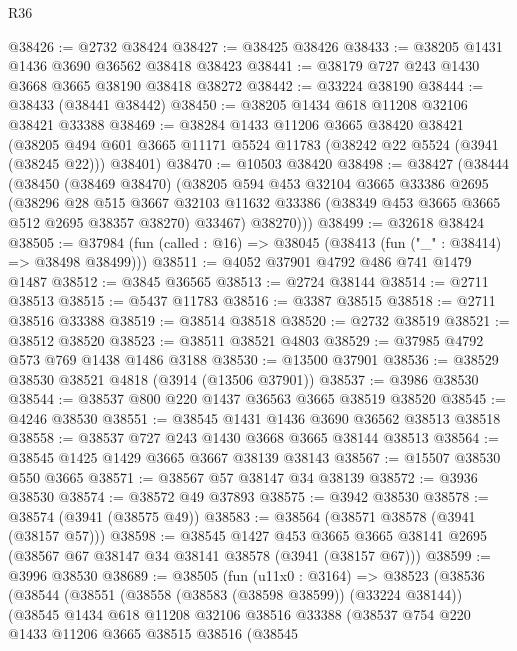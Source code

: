 \begin{lexlean}{R36}
\begin{coremodule}
@38426 := @2732 @38424
@38427 := @38425 @38426
@38433 := @38205 @1431 @1436 @3690 @36562 @38418 @38423
@38441 := @38179 @727 @243 @1430 @3668 @3665 @38190 @38418 @38272
@38442 := @33224 @38190
@38444 := @38433 (@38441 @38442)
@38450 := @38205 @1434 @618 @11208 @32106 @38421 @33388
@38469 := @38284
    @1433
    @11206
    @3665
    @38420
    @38421
    (@38205 @494 @601 @3665 @11171 @5524 @11783 (@38242 @22 @5524 (@3941 (@38245 @22))) @38401)
@38470 := @10503 @38420
@38498 := @38427
    (@38444
      (@38450
        (@38469 @38470)
        (@38205
          @594
          @453
          @32104
          @3665
          @33386
          @2695
          (@38296
            @28
            @515
            @3667
            @32103
            @11632
            @33386
            (@38349 @453 @3665 @3665 @512 @2695 @38357 @38270)
            @33467)
          @38270)))
@38499 := @32618 @38424
@38505 := @37984 (fun (called : @16) => @38045 (@38413 (fun ("_" : @38414) => @38498 @38499)))
@38511 := @4052 @37901 @4792 @486 @741 @1479 @1487
@38512 := @3845 @36565
@38513 := @2724 @38144
@38514 := @2711 @38513
@38515 := @5437 @11783
@38516 := @3387 @38515
@38518 := @2711 @38516 @33388
@38519 := @38514 @38518
@38520 := @2732 @38519
@38521 := @38512 @38520
@38523 := @38511 @38521 @4803
@38529 := @37985 @4792 @573 @769 @1438 @1486 @3188
@38530 := @13500 @37901
@38536 := @38529 @38530 @38521 @4818 (@3914 (@13506 @37901))
@38537 := @3986 @38530
@38544 := @38537 @800 @220 @1437 @36563 @3665 @38519 @38520
@38545 := @4246 @38530
@38551 := @38545 @1431 @1436 @3690 @36562 @38513 @38518
@38558 := @38537 @727 @243 @1430 @3668 @3665 @38144 @38513
@38564 := @38545 @1425 @1429 @3665 @3667 @38139 @38143
@38567 := @15507 @38530 @550 @3665
@38571 := @38567 @57 @38147 @34 @38139
@38572 := @3936 @38530
@38574 := @38572 @49 @37893
@38575 := @3942 @38530
@38578 := @38574 (@3941 (@38575 @49))
@38583 := @38564 (@38571 @38578 (@3941 (@38157 @57)))
@38598 := @38545
    @1427
    @453
    @3665
    @3665
    @38141
    @2695
    (@38567 @67 @38147 @34 @38141 @38578 (@3941 (@38157 @67)))
@38599 := @3996 @38530
@38689 := @38505
    (fun (u11x0 : @3164) =>
    @38523
      (@38536
        (@38544
          (@38551
            (@38558 (@38583 (@38598 @38599)) (@33224 @38144))
            (@38545
              @1434
              @618
              @11208
              @32106
              @38516
              @33388
              (@38537
                @754
                @220
                @1433
                @11206
                @3665
                @38515
                @38516
                (@38545

\end{coremodule}
\end{lexlean}
